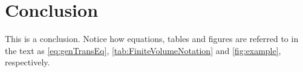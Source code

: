 \section{Conclusion}

This is a conclusion. Notice how equations, tables and figures are referred to in the text as \cref{eq:genTransEq}, \cref{tab:FiniteVolumeNotation} and \cref{fig:example}, respectively.

